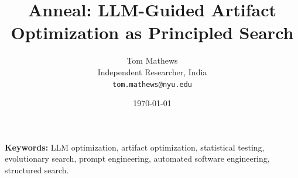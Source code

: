 \documentclass[10pt]{article}
\title{\textbf{Anneal: LLM-Guided Artifact Optimization as Principled Search}}
\author{%
  Tom Mathews \\
  Independent Researcher, India \\
  \texttt{tom.mathews@nyu.edu}%
}
\date{\today}
\renewcommand{\_}{\oldunderscore\hspace{0pt}}
\begin{document}
\maketitle

\pagestyle{fancy}
\fancyhf{}
\renewcommand{\headrulewidth}{0pt}
\fancyfoot[C]{\thepage}
\thispagestyle{fancy}

\begin{abstract}

\end{abstract}

\noindent\textbf{Keywords:} LLM optimization, artifact optimization, statistical
testing, evolutionary search, prompt engineering, automated software engineering,
structured search.

\medskip












\end{document}
